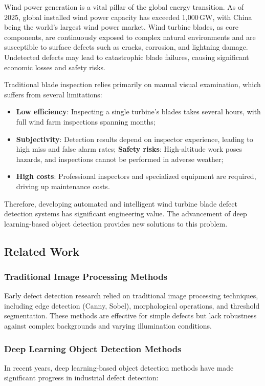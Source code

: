 \documentclass[12pt,a4paper]{article}
\begin{document}
Wind power generation is a vital pillar of the global energy transition. As of 2025, global installed wind power capacity has exceeded 1,000\,GW, with China being the world's largest wind power market. Wind turbine blades, as core components, are continuously exposed to complex natural environments and are susceptible to surface defects such as cracks, corrosion, and lightning damage. Undetected defects may lead to catastrophic blade failures, causing significant economic losses and safety risks.

Traditional blade inspection relies primarily on manual visual examination, which suffers from several limitations:
\begin{itemize}[noitemsep]
  \item \textbf{Low efficiency}: Inspecting a single turbine's blades takes several hours, with full wind farm inspections spanning months;
  \item \textbf{Subjectivity}: Detection results depend on inspector experience, leading to high miss and false alarm rates;
  \textbf{Safety risks}: High-altitude work poses hazards, and inspections cannot be performed in adverse weather;
  \item \textbf{High costs}: Professional inspectors and specialized equipment are required, driving up maintenance costs.
\end{itemize}

Therefore, developing automated and intelligent wind turbine blade defect detection systems has significant engineering value. The advancement of deep learning-based object detection provides new solutions to this problem.

\subsection{Related Work}

\subsubsection{Traditional Image Processing Methods}
Early defect detection research relied on traditional image processing techniques, including edge detection (Canny, Sobel), morphological operations, and threshold segmentation. These methods are effective for simple defects but lack robustness against complex backgrounds and varying illumination conditions.

\subsubsection{Deep Learning Object Detection Methods}
In recent years, deep learning-based object detection methods have made significant progress in industrial defect detection:
\end{document}
